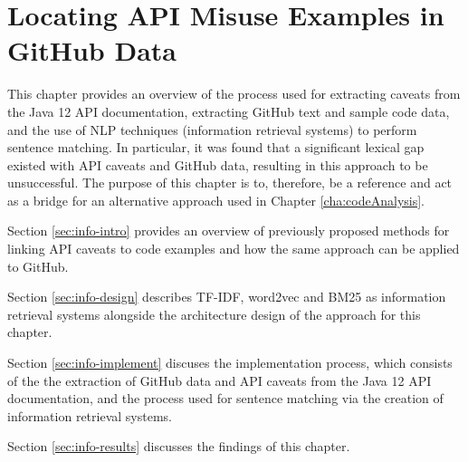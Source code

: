 \chapter{Locating API Misuse Examples in GitHub Data}
\label{cha:infoRetrieval}
This chapter provides an overview of the process used for extracting caveats from the Java 12 API documentation, extracting GitHub text and sample code data, and the use of NLP techniques (information retrieval systems) to perform sentence matching.  In particular, it was found that a significant lexical gap existed with API caveats and GitHub data, resulting in this approach to be unsuccessful. The purpose of this chapter is to, therefore, be a reference and act as a bridge for an alternative approach used in Chapter \ref{cha:codeAnalysis}. \bigbreak

\noindent
Section \ref{sec:info-intro} provides an overview of previously proposed methods for linking API caveats to code examples and how the same approach can be applied to GitHub. \bigbreak

\noindent
Section \ref{sec:info-design} describes TF-IDF, word2vec and BM25 as information retrieval systems alongside the architecture design of the approach for this chapter.\bigbreak

Section \ref{sec:info-implement} discuses the implementation process, which consists of the 
the extraction of GitHub data and API caveats from the Java 12 API documentation, and the process used for sentence matching via the creation of information retrieval systems. \bigbreak

\noindent
Section \ref{sec:info-results} discusses the findings of this chapter. \bigbreak

